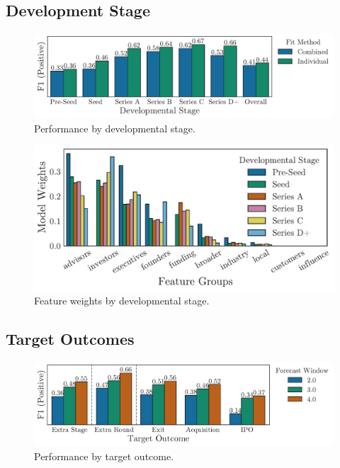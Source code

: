\documentclass[../thesis/thesis.tex]{subfiles}
\begin{document}
\subsection{Development Stage}



\begin{figure}[!htb]
    \centering
    \includegraphics[width=\textwidth]{../figures/evaluation/performance_stage}
    \caption[Performance by developmental stage]{Performance by developmental stage.}
    \label{fig:evaluation:f1_predictive_stage}
\end{figure}


\begin{figure}[!htb]
    \centering
    \includegraphics[width=\textwidth]{../figures/evaluation/features_stage}
    \caption[Feature weights by developmental stage]{Feature weights by developmental stage.}
    \label{fig:evaluation:feature_groups_stage}
\end{figure}

\subsection{Target Outcomes}



\begin{figure}[!htb]
    \centering
    \includegraphics[width=\textwidth]{../figures/evaluation/performance_outcome}
    \caption[Performance by target outcome]{Performance by target outcome.}
    \label{fig:evaluation:f1_predictive_outcome}
\end{figure}
\end{document}
